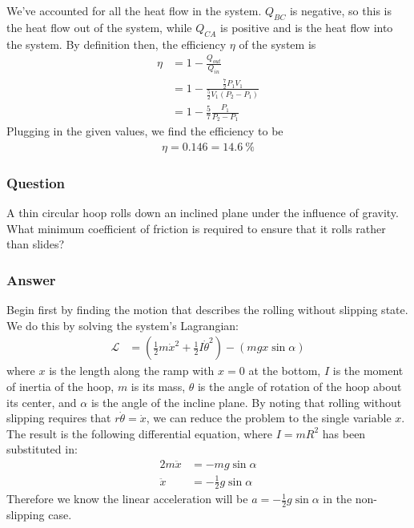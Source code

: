 We've accounted for all the heat flow in the system. $Q_{BC}$ is negative, so
this is the heat flow out of the system, while $Q_{CA}$ is positive and is the
heat flow into the system. By definition then, the efficiency ${\eta}$ of the system
is
\begin{align*}
    {\eta} &= 1 - \frac{Q_{out}}{Q_{in}} \\
    {}&= 1 - \frac{\frac 72 P_1 V_1}{\frac 52 V_1 (P_2 - P_1)} \\
    {}&= 1 - \frac 57 \frac{P_1}{P_2 - P_1}
\end{align*}
Plugging in the given values, we find the efficiency to be
\begin{align}
    \boxed{
    {\eta} = 0.146 = \SI{14.6}{\percent}
    }
\end{align}

\subsubsection{Question}

A thin circular hoop rolls down an inclined plane under the influence of
gravity. What minimum coefficient of friction is required to ensure that it
rolls rather than slides?

\subsubsection{Answer}

Begin first by finding the motion that describes the rolling without slipping
state. We do this by solving the system's Lagrangian:
\begin{align*}
    \mathcal L &= (\frac 12 m{\dot x}^2 + \frac 12 I{\dot \theta }^2) - (mgx\sin {\alpha})
\end{align*}
where $x$ is the length along the ramp with $x=0$ at the bottom, $I$ is the
moment of inertia of the hoop, $m$ is its mass, $\theta $ is the angle of rotation
of the hoop about its center, and ${\alpha}$ is the angle of the incline plane. By
noting that rolling without slipping requires that $r\dot \theta  = \dot x$, we
can reduce the problem to the single variable $x$. The result is the following
differential equation, where $I = mR^2$ has been substituted in:
\begin{align*}
    2m \ddot x &= -mg\sin {\alpha} \\
    \ddot x &= -\frac 12 g\sin {\alpha}
\end{align*}
Therefore we know the linear acceleration will be $a = -\frac 12 g\sin {\alpha}$ in
the non-slipping case.

